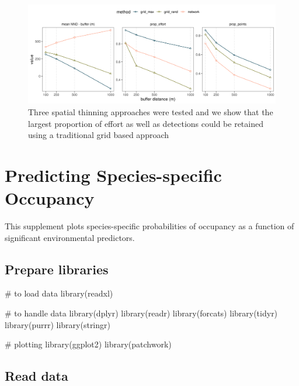 \documentclass[]{article}
\newenvironment{Shaded}{}{}
\newcommand{\CommentTok}[1]{\textcolor[rgb]{0.00,0.50,0.00}{#1}}
\newcommand{\KeywordTok}[1]{\textcolor[rgb]{0.00,0.00,1.00}{#1}}
\newcommand{\NormalTok}[1]{#1}
\begin{document}
\begin{figure}
\centering
\includegraphics{figs/fig_spatial_thinning_02.png}
\caption{Three spatial thinning approaches were tested and we show that the largest proportion of effort as well as detections could be retained using a traditional grid based approach}
\end{figure}

\hypertarget{predicting-species-specific-occupancy}{%
\section{Predicting Species-specific Occupancy}\label{predicting-species-specific-occupancy}}

This supplement plots species-specific probabilities of occupancy as a function of significant environmental predictors.

\hypertarget{prepare-libraries-4}{%
\subsection{Prepare libraries}\label{prepare-libraries-4}}

\begin{Shaded}
\begin{Highlighting}[numbers=left,,]
\CommentTok{# to load data}
\KeywordTok{library}\NormalTok{(readxl)}

\CommentTok{# to handle data}
\KeywordTok{library}\NormalTok{(dplyr)}
\KeywordTok{library}\NormalTok{(readr)}
\KeywordTok{library}\NormalTok{(forcats)}
\KeywordTok{library}\NormalTok{(tidyr)}
\KeywordTok{library}\NormalTok{(purrr)}
\KeywordTok{library}\NormalTok{(stringr)}

\CommentTok{# plotting}
\KeywordTok{library}\NormalTok{(ggplot2)}
\KeywordTok{library}\NormalTok{(patchwork)}
\end{Highlighting}
\end{Shaded}

\hypertarget{read-data}{%
\subsection{Read data}\label{read-data}}
\end{document}

